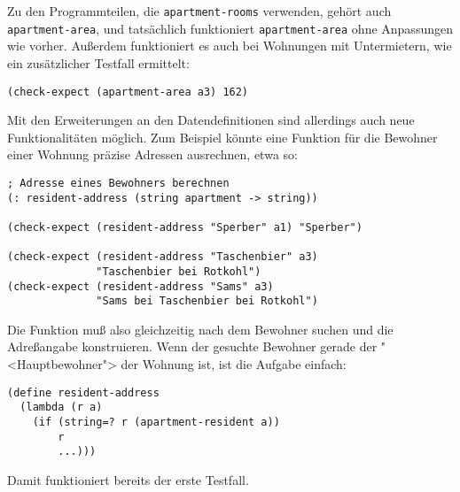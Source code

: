 Zu den Programmteilen, die \texttt{apartment-rooms} verwenden,
gehört auch \texttt{apartment-area}, und tatsächlich funktioniert
\texttt{apartment-area} ohne Anpassungen wie vorher.  Außerdem
funktioniert es auch bei Wohnungen mit Untermietern, wie ein
zusätzlicher Testfall ermittelt:
%
\begin{verbatim}
(check-expect (apartment-area a3) 162)
\end{verbatim}
%
Mit den Erweiterungen an den Datendefinitionen sind allerdings auch
neue Funktionalitäten möglich.  Zum Beispiel könnte eine Funktion für
die Bewohner einer Wohnung präzise Adressen ausrechnen, etwa so:
%
\begin{verbatim}
; Adresse eines Bewohners berechnen
(: resident-address (string apartment -> string))

(check-expect (resident-address "Sperber" a1) "Sperber")

(check-expect (resident-address "Taschenbier" a3)
              "Taschenbier bei Rotkohl") 
(check-expect (resident-address "Sams" a3)
              "Sams bei Taschenbier bei Rotkohl")
\end{verbatim}
%
Die Funktion muß also gleichzeitig nach dem Bewohner suchen und die
Adreßangabe konstruieren.  Wenn der gesuchte Bewohner gerade der
"<Hauptbewohner"> der Wohnung ist, ist die Aufgabe einfach:
%
\begin{verbatim}
(define resident-address
  (lambda (r a)
    (if (string=? r (apartment-resident a))
        r
        ...)))
\end{verbatim}
%
Damit funktioniert bereits der erste Testfall. 

